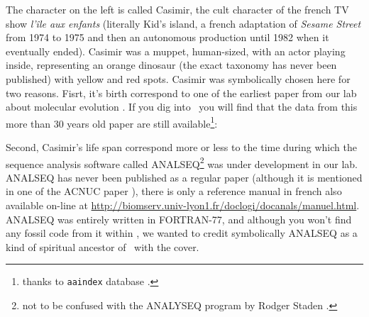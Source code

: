 \documentclass[a4paper]{article}
\begin{document}
The character on the left is called Casimir, the cult character of the french
TV show \textit{l'{\^i}le aux enfants} (literally Kid's island, a french adaptation
of \textit{Sesame Street} from 1974 to 1975 and then an autonomous
production until 1982 when it eventually ended). Casimir was a muppet, 
human-sized, with an actor playing inside, representing an orange dinosaur
(the exact taxonomy has never been published) with yellow and red spots.
Casimir was symbolically chosen here for two reasons. Fisrt, it's birth 
correspond to one of the earliest paper from our lab about molecular 
evolution \cite{GranthamR1974}. If you dig into \seqinr{}~you will find
that the data from this more than 30 years old paper are still available\footnote{
thanks to \texttt{aaindex} database \cite{aaindex1,aaindex2,aaindex3}.
}:

\begin{Schunk}
\begin{Sinput}
 data(aaindex)
 grth <- which(sapply(aaindex, function(x) length(grep("Grantham", 
     x$A)) != 0))
 lapply(aaindex[grth], "[[", "D")
\end{Sinput}
\end{Schunk}

Second, Casimir's life span correspond more or less to the time during which
the sequence analysis software called ANALSEQ\footnote{
not to be confused with the ANALYSEQ program by Rodger Staden \cite{analyseq}.
} \cite{analseq} was under
development in our lab. ANALSEQ has never been published as a regular
paper (although it is mentioned in one of the ACNUC paper \cite{acnuc1984}),
there is only a reference manual in french \cite{analseq} also available on-line
at \url{http://biomserv.univ-lyon1.fr/doclogi/docanals/manuel.html}. ANALSEQ
was entirely written in FORTRAN-77, and although you won't find any fossil
code from it within \seqinr{}, we wanted to credit symbolically ANALSEQ as 
a kind of spiritual ancestor of \seqinr{}~with the cover.
\end{document}
